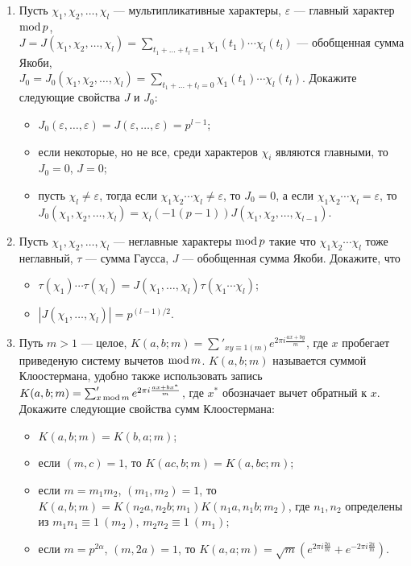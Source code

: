\begin{enumerate}[topsep=0pt]
    \item Пусть $\chi_1, \chi_2, \dots, \chi_l$ --- мультипликативные характеры, $\varepsilon$ --- главный характер $\operatorname{mod} p$,\\ $J = J(\chi_1, \chi_2, \dots, \chi_l) = \sum\limits_{t_1+\dots+t_l=1} \chi_1(t_1) \cdots \chi_l(t_l)$ --- обобщенная сумма Якоби,\\ $J_0 = J_0(\chi_1, \chi_2, \dots, \chi_l) = \sum\limits_{t_1+\dots+t_l=0} \chi_1(t_1) \cdots \chi_l(t_l)$. Докажите следующие свойства $J$ и $J_0$:
    \begin{itemize}[noitemsep,topsep=0pt]
        \item $J_0(\varepsilon, \dots, \varepsilon) = J(\varepsilon, \dots, \varepsilon) = p^{l-1}$;
        \item если некоторые, но не все, среди характеров $\chi_i$ являются главными, то $J_0 = 0$, $J = 0$;
        \item пусть $\chi_l \neq \varepsilon$, тогда если $\chi_1 \chi_2 \cdots \chi_l \neq \varepsilon$, то $J_0 = 0$, а если $\chi_1 \chi_2 \cdots \chi_l = \varepsilon$, то $J_0 (\chi_1, \chi_2, \dots, \chi_l)= \chi_l(-1(p-1))J(\chi_1, \chi_2, \dots, \chi_{l-1})$.
    \end{itemize} %

    \item Пусть $\chi_1, \chi_2, \dots, \chi_l$ --- неглавные характеры $\operatorname{mod} p$ такие что $\chi_1 \chi_2 \cdots \chi_l$ тоже неглавный, $\tau$ --- сумма Гаусса, $J$ --- обобщенная сумма Якоби. Докажите, что
    \begin{itemize}[noitemsep,topsep=0pt]
        \item $\tau(\chi_1) \cdots \tau(\chi_l) = J(\chi_1, \dots, \chi_l) \tau(\chi_1 \cdots \chi_l)$;
        \item $|J(\chi_1, \dots, \chi_l)| = p^{(l-1)/2}$.
    \end{itemize} %

    \item Путь $m>1$ --- целое, $K(a,b;m) = \sum'_{xy\equiv 1 (m)} e^{2\pi i \frac{ax+by}{m}}$, где $x$ пробегает приведеную систему вычетов $\operatorname{mod} m$. $K(a,b;m)$ называется суммой Клоостермана, удобно также использовать запись $K(a,b;m) = \sum'_{x \operatorname{mod} m} e^{2\pi i \frac{ax+bx^*}{m}}$, где $x^*$ обозначает вычет обратный к $x$. Докажите следующие свойства сумм Клоостермана:
    \begin{itemize}[noitemsep,topsep=0pt]
        \item $K(a,b;m)=K(b,a;m)$;
        \item если $(m,c)=1$, то $K(ac,b;m)=K(a,bc;m)$;
        \item если $m=m_1 m_2$, $(m_1,m_2)=1$, то $K(a,b;m)=K(n_2 a,n_2 b;m_1)K(n_1 a,n_1 b;m_2)$, где $n_1,n_2$ определены из $m_1 n_1 \equiv 1\ (m_2)$, $m_2 n_2 \equiv 1\ (m_1)$;
        \item если $m=p^{2\alpha}$, $(m,2a)=1$, то $K(a,a;m)=\sqrt{m}(e^{2\pi i \frac{2a}{m}}+e^{-2\pi i \frac{2a}{m}})$.
    \end{itemize} %


\end{enumerate}
